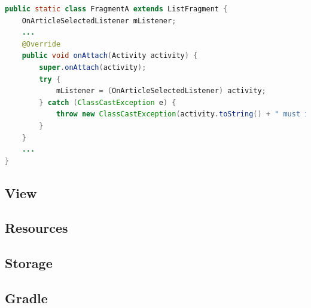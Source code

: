 \begin{lstlisting}[language=JAVA, caption=Example code for enforcing the implementation of a callback interface, label=lst:callback_interface]
public static class FragmentA extends ListFragment {
    OnArticleSelectedListener mListener;
    ...
    @Override
    public void onAttach(Activity activity) {
        super.onAttach(activity);
        try {
            mListener = (OnArticleSelectedListener) activity;
        } catch (ClassCastException e) {
            throw new ClassCastException(activity.toString() + " must implement OnArticleSelectedListener");
        }
    }
    ...
}
\end{lstlisting}

\subsection{View}


\subsection{Resources}


\subsection{Storage}
\label{storage}


\subsection{Gradle}
